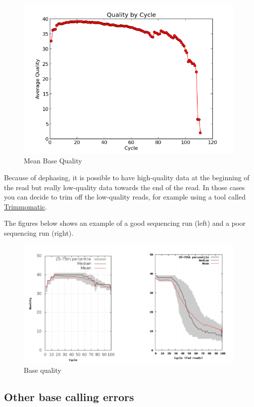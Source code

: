 \documentclass[11pt]{article}
\begin{document}
    \begin{figure}[!h]
\centering
\includegraphics{img/base_qual.png}
\caption{Mean Base Quality}
\end{figure}

    Because of dephasing, it is possible to have high-quality data at the
beginning of the read but really low-quality data towards the end of the
read. In those cases you can decide to trim off the low-quality reads,
for example using a tool called
\href{http://www.usadellab.org/cms/?page=trimmomatic}{Trimmomatic}.

The figures below shows an example of a good sequencing run (left) and a
poor sequencing run (right).

    \begin{figure}[!h]
\centering
\includegraphics{img/base_qual_comparison.png}
\caption{Base quality}
\end{figure}


    \hypertarget{other-base-calling-errors}{%
\subsection{Other base calling errors}\label{other-base-calling-errors}}
\end{document}
